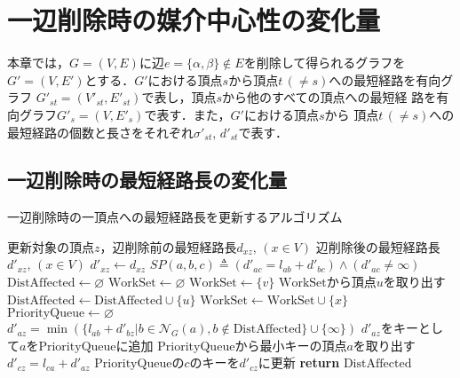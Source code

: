 \chapter{一辺削除時の媒介中心性の変化量}
\label{chap:update-bc-on-delete}
本章では，$G=(V,E)$に辺$e=\{\alpha,\beta\} \not\in E$を削除して得られるグラフを
$G'=(V,E')$とする．$G'$における頂点$s$から頂点$t\,(\neq s)$への最短経路を有向グラフ
$G'_{st}=(V'_{st},E'_{st})$で表し，頂点$s$から他のすべての頂点への最短経
路を有向グラフ$G'_s=(V,E'_s)$で表す．また，$G'$における頂点$s$から
頂点$t\,(\neq s)$への最短経路の個数と長さをそれぞれ$\sigma'_{st}$, 
$d'_{st}$で表す．

\section{一辺削除時の最短経路長の変化量}
\label{sect:update-dist-on-delete}

\begin{algorithm}[H]
  \caption{一辺削除時の一頂点への最短経路長を更新するアルゴリズム}
  \label{algo:update-dist-on-delete}
  \begin{algorithmic}[1]
    \Require 更新対象の頂点$z$，辺削除前の最短経路長$d_{xz},\,(x\in V)$
    \Ensure 辺削除後の最短経路長$d'_{xz},\,(x\in V)$
    \State $d'_{xz}\gets d_{xz}$
    \State $SP(a,b,c)\triangleq(d'_{ac}=l_{ab}+d'_{bc})\land(d'_{ac}\neq\infty)$
    \State $\mathrm{DistAffected}\gets\varnothing$
    \State $\mathrm{WorkSet}\gets\varnothing$
    \Else
    \State $\mathrm{WorkSet}\gets\{v\}$
    \EndIf
    \State $\mathrm{WorkSet}$から頂点$u$を取り出す
    \State $\mathrm{DistAffected}\gets\mathrm{DistAffected}\cup\{u\}$
    \State $\mathrm{WorkSet}\gets\mathrm{WorkSet}\cup\{x\}$
    \EndIf
    \EndFor
    \EndWhile
    \State $\mathrm{PriorityQueue}\gets\varnothing$
    \State $d'_{az}=\min(\{l_{ab}+d'_{bz}|b\in\mathcal{N}_G(a),b\notin\mathrm{DistAffected}\}\cup\{\infty\})$
    \State $d'_{az}$をキーとして$a$を$\mathrm{PriorityQueue}$に追加
    \EndIf
    \EndFor
    \State $\mathrm{PriorityQueue}$から最小キーの頂点$a$を取り出す
    \State $d'_{cz}=l_{ca}+d'_{az}$
    \State $\mathrm{PriorityQueue}$の$c$のキーを$d'_{cz}$に更新
    \EndFor
    \EndWhile
    \State \textbf{return} $\mathrm{DistAffected}$
    \EndProcedure
  \end{algorithmic}
\end{algorithm}


